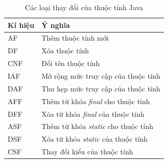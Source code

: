 \documentclass[12pt]{report}
\begin{document}
\begin{table}[h]
	\centering
	\caption{Các loại thay đổi của thuộc tính Java}
	\label{tbl:field-ct}
	\begin{tabular}{|l|l|}
		\hline
		\textbf{Kí hiệu} & \textbf{Ý nghĩa}                                        \\ \hline
		AF               & Thêm thuộc tính mới                                            \\ \hline
		DF               & Xóa thuộc tính                                                 \\
		\hline
		CNF               & Đổi tên thuộc tính                                                 \\
		\hline
		IAF              & Mở rộng mức truy cập của thuộc tính                            \\ \hline
		DAF              & Thu hẹp mức truy cập của thuộc tính                            \\ \hline
		AFF              & Thêm từ khóa \textit{final} cho thuộc tính    \\ \hline
		DFF              & Xóa từ khóa \textit{final} của thuộc tính     \\ \hline
		ASF              & Thêm từ khóa \textit{static} cho thuộc tính   \\ \hline
		DSF              & Xóa từ khóa \textit{static} của thuộc tính    \\ \hline
		CSF              & Thay đổi kiểu của thuộc tính    \\ \hline
	\end{tabular}
\end{table}
\end{document}
